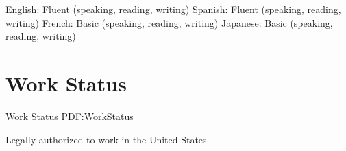 \documentclass[letterpaper,MMMyyyy,nonstop]{simpleresumecv}
\begin{document}
\begin{body}
\GapNoBreak
\BulletItem
English: Fluent (speaking, reading, writing)
\GapNoBreak
\BulletItem
Spanish: Fluent (speaking, reading, writing)
\GapNoBreak
\BulletItem
French: Basic (speaking, reading, writing)
\GapNoBreak
\BulletItem
Japanese: Basic (speaking, reading, writing)


\section
{Work Status}
{Work Status}
{PDF:WorkStatus}

Legally authorized to work in the United States.


%
%
%
%
%
\end{body}
\end{document}
